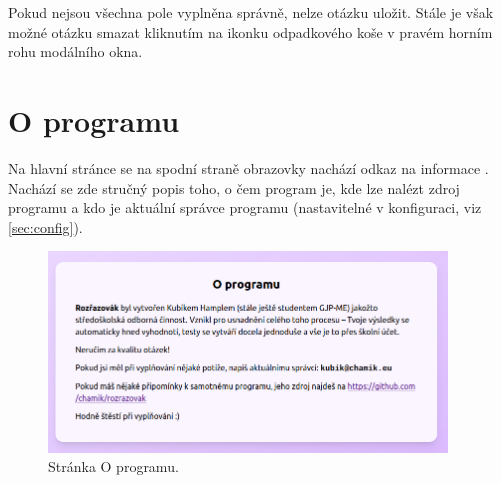 Pokud nejsou všechna pole vyplněna správně, nelze otázku uložit. Stále je však možné otázku smazat kliknutím na ikonku odpadkového koše v pravém horním rohu modálního okna.

\section{O programu}

Na hlavní stránce se na spodní straně obrazovky nachází odkaz na informace . Nachází se zde stručný popis toho, o čem program je, kde lze nalézt zdroj programu a kdo je aktuální správce programu (nastavitelné v konfiguraci, viz \ref{sec:config}).

\begin{figure}[H]
    \centering
    \includegraphics[width=400px]{images/01design/about.png}
    \caption{Stránka O programu.}
\end{figure}

